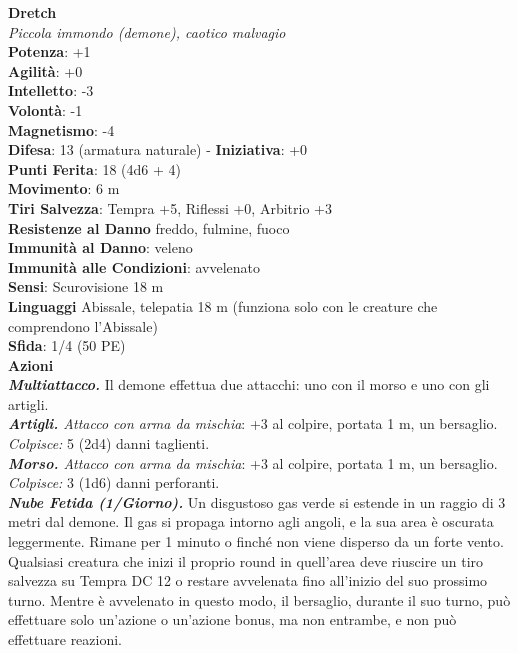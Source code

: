 \begin{multicols}{2}
\medskip\textbf{Dretch}\\
\emph{Piccola immondo (demone), caotico malvagio}\\
\textbf{Potenza}: +1\\
\textbf{Agilità}: +0\\
\textbf{Intelletto}: -3\\
\textbf{Volontà}: -1\\
\textbf{Magnetismo}: -4\\
\textbf{Difesa}: 13 (armatura naturale) - \textbf{Iniziativa}: +0\\
\textbf{Punti Ferita}: 18 (4d6 + 4)\\
\textbf{Movimento}: 6 m\\
\textbf{Tiri Salvezza}: Tempra +5, Riflessi +0, Arbitrio +3\\
\textbf{Resistenze al Danno} freddo, fulmine, fuoco\\
\textbf{Immunità al Danno}: veleno\\
\textbf{Immunità alle Condizioni}: avvelenato\\
\textbf{Sensi}: Scurovisione 18 m\\
\textbf{Linguaggi} Abissale, telepatia 18 m (funziona solo con le creature che comprendono l'Abissale)\\
\textbf{Sfida}: 1/4 (50 PE)\smallskip\\
\smallskip\textbf{Azioni}\\
\emph{\textbf{Multiattacco.}} Il demone effettua due attacchi: uno con il morso e uno con gli artigli.\\
\emph{\textbf{Artigli.} Attacco con arma da mischia}: +3 al colpire, portata 1 m, un bersaglio.\\
\emph{Colpisce:} 5 (2d4) danni taglienti.\\
\emph{\textbf{Morso.} Attacco con arma da mischia}: +3 al colpire, portata 1 m, un bersaglio.\\
\emph{Colpisce:} 3 (1d6) danni perforanti.\\
\emph{\textbf{Nube Fetida (1/Giorno).}} Un disgustoso gas verde si estende in un raggio di 3 metri dal demone. Il gas si propaga intorno agli angoli, e la sua area è oscurata leggermente. Rimane per 1 minuto o finché non viene disperso da un forte vento. Qualsiasi creatura che inizi il proprio round in quell'area deve riuscire un tiro salvezza su Tempra DC  12 o restare avvelenata fino all'inizio del suo prossimo turno. Mentre è avvelenato in questo modo, il bersaglio, durante il suo turno, può effettuare solo un'azione o un'azione bonus, ma non entrambe, e non può effettuare reazioni.\\

\end{multicols}
